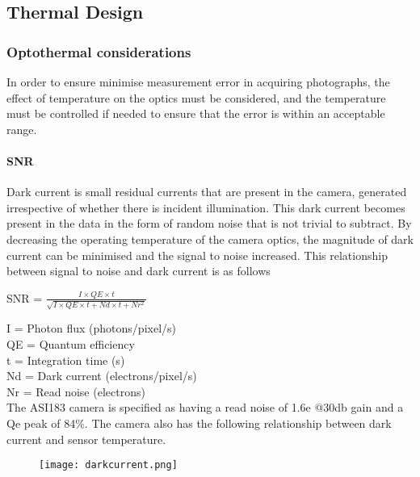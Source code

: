 \pagebreak
\subsection{Thermal Design} \label{Thermal_section}
\subsubsection{Optothermal considerations}

In order to ensure minimise measurement error in acquiring photographs, the effect of temperature on the optics must be considered, and the temperature must be controlled if needed to ensure that the error is within an acceptable range.\

\paragraph{SNR}

Dark current is small residual currents that are present in the camera, generated irrespective of whether there is incident illumination. This dark current becomes present in the data in the form of random noise that is not trivial to subtract. By decreasing the operating temperature of the camera optics, the magnitude of dark current can be minimised and the signal to noise increased. This relationship between signal to noise and dark current is as follows\\

\begin{center}
 SNR =  $\frac{I\times QE\times t}{\sqrt{I\times QE\times t+Nd\times t+Nr^2}}$\\
\end{center}

 
I = Photon flux (photons/pixel/s)\\
QE = Quantum efficiency\\
t = Integration time (s)\\
Nd = Dark current (electrons/pixel/s)\\
Nr = Read noise (electrons)\\

The ASI183 camera is specified as having a read noise of 1.6e @30db gain and a Qe peak of 84\%. The camera also has the following relationship between dark current and sensor temperature. \\


	\begin{figure}[h!]
    \centering
    \texttt{[image: darkcurrent.png]}
	\label{fig: darkcurrent}
	\end{figure}


